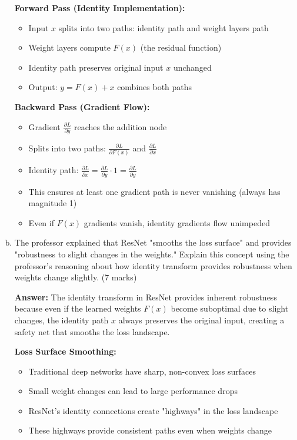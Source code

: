 \documentclass[12pt]{article}
\newcommand{\answer}[1]{{\color{answercolor}\textbf{Answer:} #1}}
\newcommand{\explanation}[1]{{\color{explanationcolor}#1}}
\begin{document}
\begin{enumerate}[(a)]
    \explanation{
    \textbf{Forward Pass (Identity Implementation):}
    \begin{itemize}
        \item Input $x$ splits into two paths: identity path and weight layers path
        \item Weight layers compute $F(x)$ (the residual function)
        \item Identity path preserves original input $x$ unchanged
        \item Output: $y = F(x) + x$ combines both paths
    \end{itemize}
    
    \textbf{Backward Pass (Gradient Flow):}
    \begin{itemize}
        \item Gradient $\frac{\partial L}{\partial y}$ reaches the addition node
        \item Splits into two paths: $\frac{\partial L}{\partial F(x)}$ and $\frac{\partial L}{\partial x}$
        \item Identity path: $\frac{\partial L}{\partial x} = \frac{\partial L}{\partial y} \cdot 1 = \frac{\partial L}{\partial y}$
        \item This ensures at least one gradient path is never vanishing (always has magnitude 1)
        \item Even if $F(x)$ gradients vanish, identity gradients flow unimpeded
    \end{itemize}
    }
    
    \item The professor explained that ResNet "smooths the loss surface" and provides "robustness to slight changes in the weights." Explain this concept using the professor's reasoning about how identity transform provides robustness when weights change slightly. \hfill (7 marks)
    
    \answer{The identity transform in ResNet provides inherent robustness because even if the learned weights $F(x)$ become suboptimal due to slight changes, the identity path $x$ always preserves the original input, creating a safety net that smooths the loss landscape.}
    
    \explanation{
    \textbf{Loss Surface Smoothing:}
    \begin{itemize}
        \item Traditional deep networks have sharp, non-convex loss surfaces
        \item Small weight changes can lead to large performance drops
        \item ResNet's identity connections create "highways" in the loss landscape
        \item These highways provide consistent paths even when weights change
    \end{itemize}
    
}
\end{enumerate}
\end{document}
